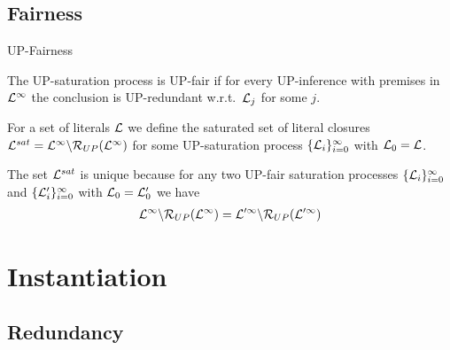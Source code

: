 \documentclass[%
handout,
]{beamer}
\begin{document}
\subsection{Fairness}
\begin{frame}{UP-Fairness}

        The UP-saturation process is {UP-fair} if for every UP-inference
        with premises in \( \mathcal{L}^\infty \) the conclusion is UP-redundant
        w.r.t.~\(\mathcal{L}_j\) for some \(j\).

        For a set of literals \( \mathcal{L} \) we define
        the saturated set of literal closures
        \( \mathcal{L}^{sat} = \mathcal{L}^\infty\backslash\mathcal{R}_{UP}(\mathcal{L}^\infty) \)
        for some UP-saturation process
        \( \{ \mathcal{L}_i\}_{i=0}^\infty \)
        with $\mathcal{L}_0 = \mathcal{L}$.
    
        \vspace{1.4em}

    \begin{lemma}
        The set \( \mathcal{L}^{sat} \) is unique because
        for any two UP-fair saturation processes
        \(\{ \mathcal{L}_i
            \}_{i=0}^\infty\) and
            \(\{ \mathcal{L}'_i
            \}_{i=0}^\infty\)
            with $\mathcal{L}_0 = \mathcal{L}'_0$ we have
            \begin{gather*}
                \mathcal{L}^\infty \backslash \mathcal{R}_{UP}(\mathcal{L}^\infty)
                =
                \mathcal{L}'^\infty \backslash \mathcal{R}_{UP}(\mathcal{L}'^\infty)
            \end{gather*}
    \end{lemma}
\end{frame}

\section{Instantiation}
\subsection{Redundancy}
\end{document}
